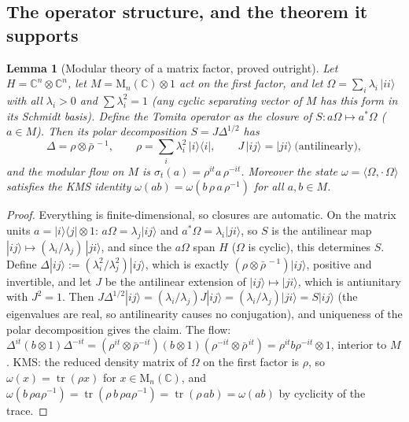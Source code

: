\documentclass[11pt]{article}
\newtheorem{lemma}[theorem]{Lemma}
\theoremstyle{definition}
\newcommand{\C}{\mathbb{C}}
\newcommand{\Mat}{\mathrm{M}}
\newcommand{\tr}{\operatorname{tr}}
\begin{document}
\subsection{The operator structure, and the theorem it supports}\label{subsec:scaffolding}

\begin{lemma}[Modular theory of a matrix factor, proved outright]\label{lem:tomita}
Let $H = \C^n \otimes \C^n$, let $M = \Mat_n(\C) \otimes 1$ act on the first factor, and let $\Omega = \sum_i \lambda_i\, |ii\rangle$ with all $\lambda_i > 0$ and $\sum \lambda_i^2 = 1$ (any cyclic separating vector of $M$ has this form in its Schmidt basis). Define the Tomita operator as the closure of $S : a\Omega \mapsto a^*\Omega$ ($a \in M$). Then its polar decomposition $S = J\Delta^{1/2}$ has
\[
\Delta = \rho \otimes \bar\rho^{\,-1}, \qquad \rho = \sum_i \lambda_i^2\,|i\rangle\langle i| , \qquad J\,|ij\rangle = |ji\rangle \ \text{(antilinearly)},
\]
and the modular flow on $M$ is $\sigma_t(a) = \rho^{it} a\, \rho^{-it}$. Moreover the state $\omega = \langle\Omega, \cdot\,\Omega\rangle$ satisfies the KMS identity $\omega(ab) = \omega(b\,\rho\,a\,\rho^{-1})$ for all $a, b \in M$.
\end{lemma}

\begin{proof}
Everything is finite-dimensional, so closures are automatic. On the matrix units $a = |i\rangle\langle j| \otimes 1$: $a\Omega = \lambda_j |ij\rangle$ and $a^*\Omega = \lambda_i |ji\rangle$, so $S$ is the antilinear map $|ij\rangle \mapsto (\lambda_i/\lambda_j)\,|ji\rangle$, and since the $a\Omega$ span $H$ ($\Omega$ is cyclic), this determines $S$. Define $\Delta |ij\rangle := (\lambda_i^2/\lambda_j^2)|ij\rangle$, which is exactly $(\rho \otimes \bar\rho^{\,-1})|ij\rangle$, positive and invertible, and let $J$ be the antilinear extension of $|ij\rangle \mapsto |ji\rangle$, which is antiunitary with $J^2 = 1$. Then $J\Delta^{1/2}|ij\rangle = (\lambda_i/\lambda_j) J|ij\rangle = (\lambda_i/\lambda_j)|ji\rangle = S|ij\rangle$ (the eigenvalues are real, so antilinearity causes no conjugation), and uniqueness of the polar decomposition gives the claim. The flow: $\Delta^{it}(b \otimes 1)\Delta^{-it} = (\rho^{it}\otimes\bar\rho^{-it})(b \otimes 1)(\rho^{-it}\otimes\bar\rho^{\,it}) = \rho^{it} b \rho^{-it} \otimes 1$, interior to $M$. KMS: the reduced density matrix of $\Omega$ on the first factor is $\rho$, so $\omega(x) = \tr(\rho x)$ for $x \in \Mat_n(\C)$, and $\omega(b\,\rho a \rho^{-1}) = \tr(\rho\, b\, \rho a \rho^{-1}) = \tr(\rho\, a b) = \omega(ab)$ by cyclicity of the trace.
\end{proof}
\end{document}
